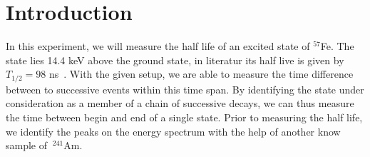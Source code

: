 \section{Introduction}
In this experiment, we will measure the half life of an excited state of 
$^{57}$Fe. The state lies 14.4 keV above the ground state, in literatur its half live is given 
by $T_{1/2} = 98$ ns~\cite{ver}. With the given setup, 
we are able to measure the time difference between to successive events within this 
time span. By identifying the state under consideration as a member of a chain of successive decays, 
we can thus measure the time between begin and end of a single state. 
Prior to measuring the half life, we identify the peaks on the energy spectrum 
with the help of another know sample of $~^{241}$Am. 


